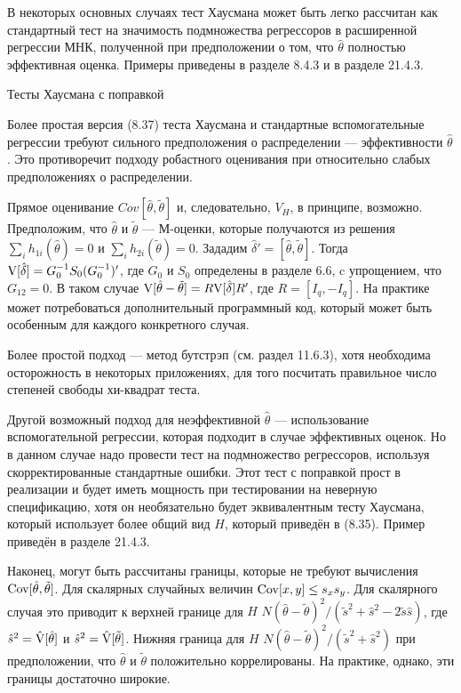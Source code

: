 В некоторых основных случаях тест Хаусмана может быть легко рассчитан как стандартный тест на значимость подмножества регрессоров в расширенной регрессии МНК, полученной при предположении о том, что $\hat{\theta}$ полностью эффективная оценка. Примеры приведены в разделе 8.4.3 и в разделе 21.4.3.

\begin{center}
Тесты Хаусмана с поправкой
\end{center}

Более простая версия (8.37) теста Хаусмана и стандартные вспомогательные регрессии требуют сильного предположения  о распределении --- эффективности $\hat{\theta}$. Это противоречит подходу робастного оценивания  при относительно слабых предположениях о распределении.

Прямое оценивание $Cov[\hat{\theta},\tilde{\theta}]$ и, следовательно, $V_H$, в принципе, возможно. Предположим, что $\hat{\theta}$ и $\tilde{\theta}$ --- М-оценки, которые получаются из решения $\sum_i h_{1i}(\hat{\theta}) = 0$ и $\sum_i h_{2i}(\tilde{\theta}) = 0$. Зададим $\hat{\delta}' = [\hat{\theta},\tilde{\theta}]$. Тогда $\mathrm{V}[\hat{\delta}] = G_0^{-1}S_0( G_0^{-1})'$, где $G_0$ и $S_0$ определены в разделе 6.6, c упрощением, что $G_{12} = 0$. В таком случае $\mathrm{V}[\hat{\theta} - \tilde{\theta}] = R\mathrm{V}[\hat{\delta}]R'$, где $R = [I_q, - I_q]$. На практике может потребоваться дополнительный программный код, который может быть особенным для каждого конкретного случая.

Более простой подход --- метод бутстрэп (см. раздел 11.6.3), хотя необходима осторожность в некоторых приложениях, для того посчитать правильное число степеней свободы хи-квадрат теста.

Другой возможный подход для неэффективной $\hat{\theta}$ --- использование вспомогательной регрессии, которая подходит в случае эффективных оценок. Но в данном случае надо провести тест на подмножество регрессоров, используя скорректированные стандартные ошибки. Этот тест с поправкой прост в реализации и будет иметь мощность при тестировании на неверную спецификацию, хотя он необязательно будет эквивалентным тесту Хаусмана, который использует более общий вид $H$, который приведён в (8.35). Пример приведён в разделе 21.4.3.

Наконец, могут быть рассчитаны границы, которые не требуют вычисления $\mathrm{Cov}[\hat{\theta},\tilde{\theta}]$. Для скалярных случайных величин $\mathrm{Cov}[x,y] \leq s_xs_y$. Для скалярного случая это приводит к верхней границе для $H$ $N(\hat{\theta} - \tilde{\theta})^2/(\tilde{s}^2 + \hat{s}^2 - 2\tilde{s}\hat{s})$, где $\hat{s}^2 = \hat{\mathrm{V}}[\hat{\theta}]$ и $\hat{s}^2 = \hat{\mathrm{V}}[\tilde{\theta}]$. Нижняя граница для $H$ $N(\hat{\theta} - \tilde{\theta})^2/(\tilde{s}^2 + \hat{s}^2)$ при предположении, что $\hat{\theta}$ и $\tilde{\theta}$ положительно коррелированы. На практике, однако, эти границы достаточно широкие.

